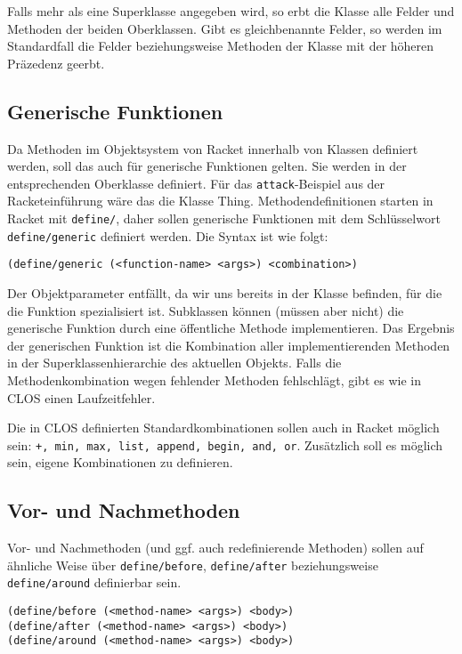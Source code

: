 Falls mehr als eine Superklasse angegeben wird, so erbt die Klasse alle Felder und Methoden der beiden Oberklassen. Gibt es gleichbenannte Felder, so werden im Standardfall die Felder beziehungsweise Methoden der Klasse mit der höheren Präzedenz geerbt.

\subsection{Generische Funktionen}
Da Methoden im Objektsystem von Racket innerhalb von Klassen definiert werden, soll das auch für generische Funktionen gelten. Sie werden in der entsprechenden Oberklasse definiert. Für das \texttt{attack}-Beispiel aus der Racketeinführung wäre das die Klasse Thing. Methodendefinitionen starten in Racket mit \texttt{define/}, daher sollen generische Funktionen mit dem Schlüsselwort \texttt{define/generic} definiert werden. Die Syntax ist wie folgt:

\texttt{(define/generic ({\textless}function-name{\textgreater} {\textless}args{\textgreater}) {\textless}combination{\textgreater})}

Der Objektparameter entfällt, da wir uns bereits in der Klasse befinden, für die die Funktion spezialisiert ist. Subklassen können (müssen aber nicht) die generische Funktion durch eine öffentliche Methode implementieren. Das Ergebnis der generischen Funktion ist die Kombination aller implementierenden Methoden in der Superklassenhierarchie des aktuellen Objekts. Falls die Methodenkombination wegen fehlender Methoden fehlschlägt, gibt es wie in CLOS einen Laufzeitfehler.

Die in CLOS definierten Standardkombinationen sollen auch in Racket möglich sein: \texttt{+, min, max, list, append, begin, and, or}. 
Zusätzlich soll es möglich sein, eigene Kombinationen zu definieren.


\subsection{Vor- und Nachmethoden}
Vor- und Nachmethoden (und ggf. auch redefinierende Methoden) sollen auf ähnliche Weise über \texttt{define/before}, \texttt{define/after} beziehungsweise \texttt{define/around} definierbar sein. 

\texttt{(define/before ({\textless}method-name{\textgreater} {\textless}args{\textgreater}) {\textless}body{\textgreater})}\\
\texttt{(define/after ({\textless}method-name{\textgreater} {\textless}args{\textgreater}) {\textless}body{\textgreater})}\\
\texttt{(define/around ({\textless}method-name{\textgreater} {\textless}args{\textgreater}) {\textless}body{\textgreater})}

